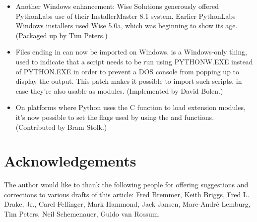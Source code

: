 \documentclass{howto}
\begin{document}
\begin{itemize}
  \item Another Windows enhancement: Wise Solutions generously offered
  PythonLabs use of their InstallerMaster 8.1 system.  Earlier
  PythonLabs Windows installers used Wise 5.0a, which was beginning to
  show its age.  (Packaged up by Tim Peters.)

  \item Files ending in  can now be imported on Windows.
   is a Windows-only thing, used to indicate that a script
  needs to be run using PYTHONW.EXE instead of PYTHON.EXE in order to
  prevent a DOS console from popping up to display the output.  This
  patch makes it possible to import such scripts, in case they're also
  usable as modules.  (Implemented by David Bolen.)

  \item On platforms where Python uses the C  function 
  to load extension modules, it's now possible to set the flags used 
  by  using the  and
   functions.    (Contributed by Bram Stolk.)
  
\end{itemize}


\section{Acknowledgements}

The author would like to thank the following people for offering
suggestions and corrections to various drafts of this article: Fred
Bremmer, Keith Briggs, Fred L. Drake, Jr., Carel Fellinger, Mark
Hammond, Jack Jansen, Marc-Andr\'e Lemburg, Tim Peters, Neil
Schemenauer, Guido van Rossum.
\end{document}

